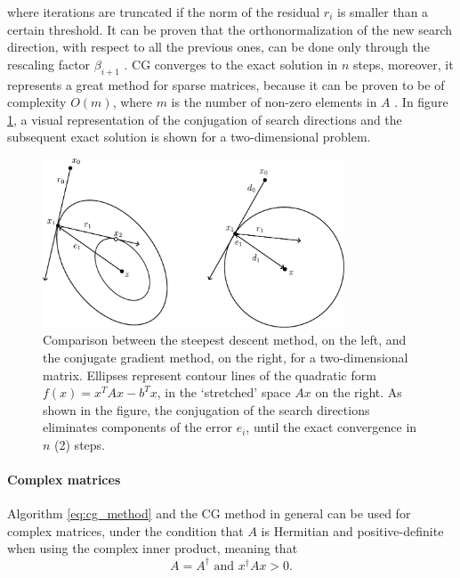 where iterations are truncated if the norm of the residual $r_i$ is smaller than a certain threshold. It can be proven that the orthonormalization of the new search direction, with respect to all the previous ones, can be done only through the rescaling factor $\beta_{i+1}$ \cite{PainlessCGM}.
CG converges to the exact solution in $n$ steps, moreover, it represents a great method for sparse matrices, because it can be proven to be of complexity $O(m)$, where $m$ is the number of non-zero elements in $A$ \cite{PainlessCGM}. In figure \ref{fig:cg}, a visual representation of the conjugation of search directions and the subsequent exact solution is shown for a two-dimensional problem.
\begin{figure}[h]
\centering
\includegraphics[width=0.8\textwidth]{Images/cg}
\caption{Comparison between the steepest descent method, on the left, and the conjugate gradient method, on the right, for a two-dimensional matrix. Ellipses represent contour lines of the quadratic form $f(x) = x^T A x - b^T x$, in the `stretched' space $Ax$ on the right. As shown in the figure, the conjugation of the search directions eliminates components of the error $e_i$, until the exact convergence in $n$ (2) steps.}
\label{fig:cg}
\end{figure}
\paragraph{Complex matrices} Algorithm \eqref{eq:cg_method} and the CG method in general can be used for complex matrices, under the condition that $A$ is Hermitian and positive-definite when using the complex inner product, meaning that
\begin{equation}
    A = A^\dagger\text{ and }
    x^\dagger Ax > 0.
\end{equation}
